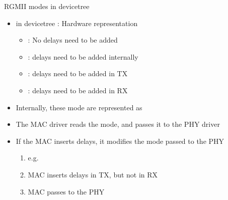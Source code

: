 \begin{frame}{RGMII modes in devicetree}
	\begin{itemize}
			\item {} in devicetree : Hardware representation
				\begin{itemize}
					\item \textbf{} : No delays need to be added
					\item \textbf{} : delays need to be added internally
					\item \textbf{} : delays need to be added in TX
					\item \textbf{} : delays need to be added in RX
				\end{itemize}
			\item Internally, these mode are represented as 
			\item The MAC driver reads the mode, and passes it to the PHY driver
			\item If the MAC inserts delays, it modifies the mode passed to the PHY
				\begin{enumerate}
					\item e.g. 
					\item MAC inserts delays in TX, but not in RX
					\item MAC passes  to the PHY
				\end{enumerate}

		\end{itemize}
\end{frame}


